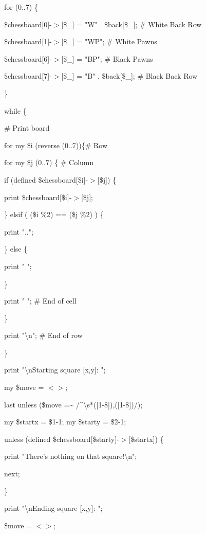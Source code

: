 \documentclass[a4paper,11pt]{book}
\begin{document}
\noindent for (0..7) \{

\noindent \$chessboard[0]-$>$[\$\_] = "W" . \$back[\$\_]; \# White Back Row

\noindent \$chessboard[1]-$>$[\$\_] = "WP"; \# White Pawns

\noindent \$chessboard[6]-$>$[\$\_] = "BP"; \# Black Pawns

\noindent \$chessboard[7]-$>$[\$\_] = "B" . \$back[\$\_]; \# Black Back Row

\noindent \}

\noindent 

\noindent while \{

\noindent \# Print board

\noindent for my \$i (reverse (0..7))\{\# Row

\noindent for my \$j (0..7) \{ \# Column

\noindent if (defined \$chessboard[\$i]-$>$[\$j]) \{

\noindent print \$chessboard[\$i]-$>$[\$j];

\noindent \} elsif ( (\$i \%2) == (\$j \%2) ) \{

\noindent print "..";

\noindent \} else \{

\noindent print "  ";

\noindent \}

\noindent print " ";  \# End of cell

\noindent \}

\noindent print "\textbackslash n"; \# End of row

\noindent \}

\noindent 

\noindent print "\textbackslash nStarting square [x,y]: ";

\noindent my \$move = $<$$>$;

\noindent last unless (\$move =\~{} /\^{}\textbackslash s*([1-8]),([1-8])/);

\noindent my \$startx = \$1-1; my \$starty = \$2-1;

\noindent 

\noindent unless (defined \$chessboard[\$starty]-$>$[\$startx]) \{

\noindent print "There's nothing on that square!\textbackslash n";

\noindent next;

\noindent \}

\noindent print "\textbackslash nEnding square [x,y]: ";

\noindent \$move = $<$$>$;
\end{document}
